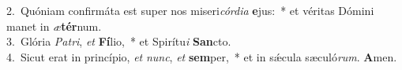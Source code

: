 {2.~}Quóniam confirmáta est super nos miseri\textit{cór}\textit{di}\textit{a} \textbf{e}jus:~* et véritas Dómini manet in \textit{æ}\textbf{tér}num.\\
{3.~}Glória \textit{Pa}\textit{tri}, \textit{et} \textbf{Fí}lio,~* et Spirítu\textit{i} \textbf{San}cto.\\
{4.~}Sicut erat in princípio, \textit{et} \textit{nunc}, \textit{et} \textbf{sem}per,~* et in sǽcula sæculó\textit{rum}. \textbf{A}men.\\
